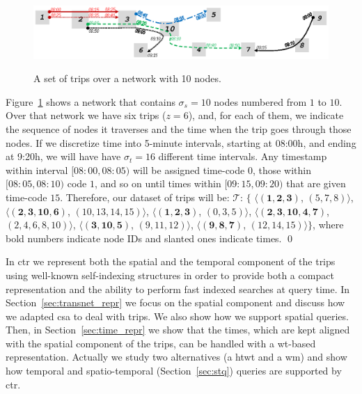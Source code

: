 	\begin{figure}[ht]
		\begin{center}
			{\includegraphics[width=1\textwidth]{figures/network.eps}}  %
		\end{center}
		\vspace{-0.2cm}
		\caption{A set of trips over a network with 10 nodes.}
		\label{fig:network}
	\end{figure}


	\begin{example} \label{exp:ctr}
	Figure~\ref{fig:network} shows a network that contains $\sigma_s=10$ nodes 
	numbered from $1$ to $10$. Over that network we have six trips ($z=6$),
	and, for each of them, we indicate the sequence of nodes it traverses
	and the time when the trip goes through those nodes. If we discretize time into
	5-minute intervals, starting at 08:00h, and ending at 9:20h, we will have
	have $\sigma_t=16$ different time intervals. Any timestamp within
	interval $\mathit{[08\!:\!00,08\!:\!05)}$ will
	be assigned time-code $0$, those within $\mathit{[08\!:\!05,08\!:\!10)}$ code $1$, and so on until
	times within $\mathit{[09\!:\!15,09\!:\!20)}$ that are given time-code $15$.  
	Therefore, our dataset of trips will be: 
	$\mathcal{T}$: $\{$%
	$\langle (\mathbf{1,2,3     })$, $(\mathit{5,7,8})                     \rangle$, 
	$\langle (\mathbf{2,3,10,6  })$, $(\mathit{10,13,14,15})           \rangle$, 
	$\langle (\mathbf{1,2,3     })$, $(\mathit{0,3,5})                     \rangle$, 
	$\langle (\mathbf{2,3,10,4,7})$, $(\mathit{2,4,6,8,10}) \rangle$, 
	$\langle (\mathbf{3,10,5    })$, $(\mathit{9,11,12})                     \rangle$, 
	$\langle (\mathbf{9,8,7     })$, $(\mathit{12,14,15})                    \rangle$$\}$, 
	where bold numbers indicate node IDs and slanted ones indicate times. \qed
	\end{example}

	In \gls{ctr} we represent both the spatial and the temporal component of the trips using well-known
	self-indexing structures in order to provide both a compact representation and the ability to 
	perform fast indexed searches at query time. In Section~\ref{sec:transnet_repr} we focus on the
	spatial component and discuss how we adapted  \gls{csa} to deal with trips. We also
	show how we support spatial queries. Then, in Section~\ref{sec:time_repr} we show that the times,
	which are kept aligned with the spatial component of the trips, can be handled with   
	a \gls{wt}-based representation. Actually we study two alternatives (a \gls{htwt} and a \gls{wm}) 
	and show how temporal and spatio-temporal (Section~\ref{sec:stq}) queries are supported by \gls{ctr}.

